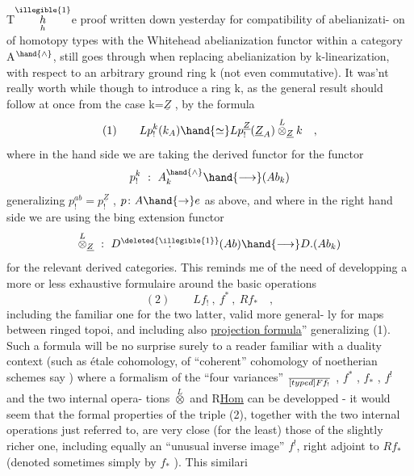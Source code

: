 T$\overset{\illegible{1}}{\underset{h}{h}}$e proof written down yesterday for compatibility of abelianizati-%
on of homotopy types with the Whitehead abelianization functor within
a category A$^{\hand{\wedge}}$,  still goes through when replacing abelianization by
k-linearization,  with respect to an arbitrary ground ring k (not even
commutative).  It was'nt really worth while though to introduce a ring
k,  as the general result should follow at once from the case k=$\underline{Z}$ ,
by the formula
\[ (1) \qquad Lp^{k}_{!}(k_{A}) \hand{\simeq} Lp^{\underline{Z}}_{!}(\underline{Z}_{A}) \overset{L}{\otimes}_{\underline{Z}} k \quad , \]
where in the   hand side we are taking the  derived functor for the
functor
\[ p^{k}_{!} \ : \ A^{\hand{\wedge}}_{k} \hand{\longrightarrow} (Ab_{k}) \]
generalizing $p^{ab}_{!} = p^{\underline{Z}}_{!}$ , \hand{(} $p\colon A \hand{\to} e$  as above\hand{)}, and where in
the  right hand side we are using the bing extension
functor
\[ \overset{L}{\otimes}_{\underline{Z}} \ : \ D\overset{\deleted{\illegible{1}}}{.}(Ab) \hand{\longrightarrow} D.(Ab_{k}) \]
for the relevant derived categories.  This reminds me of the need of
developping  a more or less exhaustive formulaire around the
basic operations
\[ (2) \qquad Lf_{!} \ , \ f^{*} \ , \ Rf_{*} \quad , \]
including the familiar one for  the two latter,  valid  more general-%
ly for maps between ringed topoi,  and including also  \uline{projection
formula}'' generalizing (1).  Such a formula will be no surprise surely
to a reader familiar with a duality context (such as étale cohomology,
of ``coherent'' cohomology of noetherian schemes say )\hand{,} where a formalism
of the ``four variances''  $\over[typed]{F}{f}_{!}$ , $f^{*}$ , $f_{*}$ , $f^{!}$  and the two internal opera-%
tions $\overset{L}{\otimes}$  and R\uline{Hom}  can be developped -  it would seem that the formal
properties of the triple (2),  together with the two internal operations
just referred to,  are very close (for the least)  those of the
slightly richer one,  including equally an ``unusual inverse image'' $f^{!}$,
 right adjoint to \uline{$Rf_{*}$}  (denoted sometimes simply by $f_{*}$ ).  This similari


